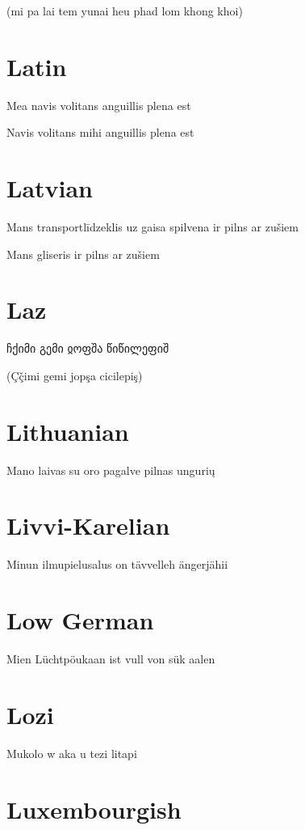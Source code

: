 \documentclass{article}
\newcommand{\freeserif}[1]{{\fontspec{FreeSerif}#1}}
\begin{document}
\noindent
(mi pa lai tem yunai heu phad lom khong khoi)

\section{Latin}

Mea navis volitans anguillis plena est

\noindent
Navis volitans mihi anguillis plena est

\section{Latvian}

Mans transportlīdzeklis uz gaisa spilvena ir pilns ar zušiem

\noindent
Mans gliseris ir pilns ar zušiem

\section{Laz}

\freeserif{ჩქიმი გემი ჲოფშა წიწილეფიშ}

\noindent
(Çç̌imi gemi jopşa cicilepiş)

\section{Lithuanian}

Mano laivas su oro pagalve pilnas ungurių

\section{Livvi-Karelian}

Minun ilmupielusalus on tävvelleh ängerjähii

\section{Low German}

Mien Lüchtpöukaan ist vull von sük aalen

\section{Lozi}

Mukolo w aka u tezi litapi

\section{Luxembourgish}
\end{document}
